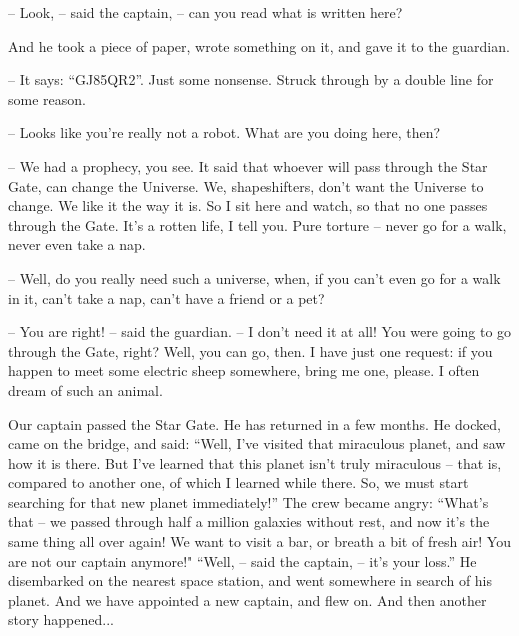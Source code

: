 \documentclass[ebook,twoside,final,openright]{memoir}
\begin{document}
– Look, – said the captain, – can you read what is written here?\par
And he took a piece of paper, wrote something on it, and gave it to the guardian.\par
– It says: “GJ85QR2”. Just some nonsense. Struck through by a double line for some reason.\par
– Looks like you're really not a robot. What are you doing here, then?\par
– We had a prophecy, you see. It said that whoever will pass through the Star Gate, can change the Universe. We, shapeshifters, don’t want the Universe to change. We like it the way it is. So I sit here and watch, so that no one passes through the Gate. It’s a rotten life, I tell you. Pure torture – never go for a walk, never even take a nap.\par
– Well, do you really need such a universe, when, if you can’t even go for a walk in it, can’t take a nap, can’t have a friend or a pet?\par
– You are right! – said the guardian. – I don’t need it at all! You were going to go through the Gate, right? Well, you can go, then. I have just one request: if you happen to meet some electric sheep somewhere, bring me one, please. I often dream of such an animal.\par
Our captain passed the Star Gate. He has returned in a few months. He docked, came on the bridge, and said: “Well, I’ve visited that miraculous planet, and saw how it is there. But I’ve learned that this planet isn’t truly miraculous – that is, compared to another one, of which I learned while there. So, we must start searching for that new planet immediately!” The crew became angry: “What’s that – we passed through half a million galaxies without rest, and now it’s the same thing all over again! We want to visit a bar, or breath a bit of fresh air! You are not our captain anymore!" “Well, – said the captain, – it’s your loss.” He disembarked on the nearest space station, and went somewhere in search of his planet. And we have appointed a new captain, and flew on. And then another story happened...
\end{document}
